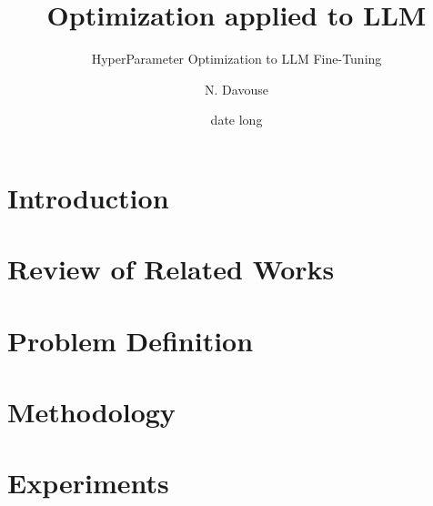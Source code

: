 \documentclass[A4,svgnames,9pt,aspectratio=169]{beamer}
\title[titrecourt]{Optimization applied to LLM}
\subtitle{HyperParameter Optimization to LLM Fine-Tuning}
\date[12/11/2024]{date long}
\author[A. et al.]{N. Davouse}
\begin{document}

\frame{\titlepage}


\renewcommand{\contentsname}{Summary}



\frame{\tocpage}

\section{Introduction}
\frame{\sectionpage}


\section{Review of Related Works}
\frame{\sectionpage}


\section{Problem Definition}
\frame{\sectionpage}


\section{Methodology}
\frame{\sectionpage}


\section{Experiments}
\frame{\sectionpage}

\end{document}
